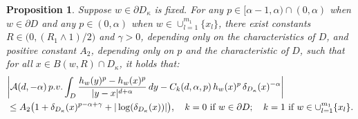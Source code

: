 \documentclass[12pt,a4paper]{amsart}
\numberwithin{equation}{section}
\theoremstyle{plain}
\newcommand{\ga}{\gamma}
\newcommand{\1}{\mathbbm{1}}
\newtheorem{prop}[theorem]{Proposition}
\begin{document}
\begin{prop} \label{perturbation: general case}
Suppose $w \in \partial D_\kappa$ is fixed. For any $p \in [\alpha - 1, \alpha) \cap (0, \alpha)$ when $w\in \partial D$ and  any $p \in (0, \alpha)$ when $w\in \cup_{l=1}^{m_1}\{x_l\}$, there exist constants $R \in \big(0, (R_1 \wedge 1)/2\big)$ and $\ga>0$, 
depending only on the characteristics of $D$,
and positive constant $A_2$, depending only on $p$ and the characteristic of $D$, such that for all $x \in B(w, R) \cap D_\kappa$, it holds that:
\begin{equation}
\begin{aligned}
& \bigg| \mathcal{A}(d, -\alpha) \, {\rm p.v.} 
\int_{D}
\frac{h_w(y)^{p} - h_w(x)^{p}}{|y-x|^{d+\alpha}} \, dy 
- C_k(d, \alpha, p) \, h_w(x)^p \, \delta_{D_\kappa}(x)^{- \alpha} \bigg| \\
& \leq A_2 \big(1 + \delta_{D_\kappa}(x)^{p-\alpha+\gamma} + |\log(\delta_{D_\kappa}(x))| \big), 
\quad k=0 \ 
\text{if} \ w \in \partial D; \quad k=1 \ \text{if} \ w \in \cup_{l=1}^{m_1}\{x_l\}.
\end{aligned}
\end{equation}
\end{prop}
\end{document}
